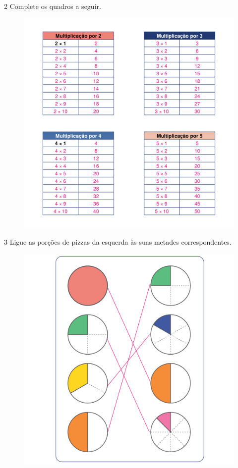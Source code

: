 \pagebreak
\num{2} Complete os quadros a seguir.

\begin{figure}[htpb!]
\includegraphics[width=\textwidth]{./media/image105_prof.png}
\end{figure}

\pagebreak
\num{3} Ligue as porções de pizzas da esquerda às suas metades correspondentes.

\begin{figure}[htpb!]
\includegraphics[width=\textwidth]{./media/image106_prof.png}
\end{figure}

